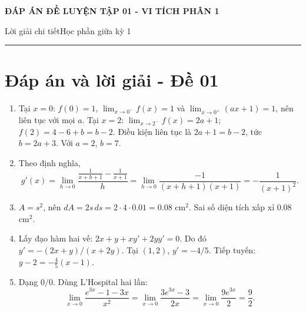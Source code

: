 \documentclass[11pt,a4paper]{article}
\newcommand{\examtitle}[4]{\begin{center}{\Large\bfseries\color{hcmusblue}#1}\par\vspace{3pt}{\large\bfseries #2}\par\vspace{3pt}\small #3\quad\textbullet\quad #4\end{center}\vspace{5pt}\hrule\vspace{8pt}}
\begin{document}
\examtitle{ĐÁP ÁN ĐỀ LUYỆN TẬP 01 - VI TÍCH PHÂN 1}{VI TÍCH PHÂN 1 - HCMUS (bộ luyện tập)}{Lời giải chi tiết}{Học phần giữa kỳ 1}

\section*{Đáp án và lời giải - Đề 01}
\begin{enumerate}
\item Tại $x=0$: $f(0)=1$, $\lim_{x\to0^-}f(x)=1$ và $\lim_{x\to0^+}(ax+1)=1$, nên liên tục với mọi $a$. Tại $x=2$: $\lim_{x\to2^-}f(x)=2a+1$; $f(2)=4-6+b=b-2$. Điều kiện liên tục là $2a+1=b-2$, tức $b=2a+3$. Với $a=2$, $b=7$.
\item Theo định nghĩa,
\[
g'(x)=\lim_{h\to0}\frac{\frac1{x+h+1}-\frac1{x+1}}h
=\lim_{h\to0}\frac{-1}{(x+h+1)(x+1)}=-\frac1{(x+1)^2}.
\]
\item $A=s^2$, nên $dA=2s\,ds=2\cdot4\cdot0.01=0.08\text{ cm}^2$. Sai số diện tích xấp xỉ $0.08$ cm$^2$.
\item Lấy đạo hàm hai vế: $2x+y+xy'+2yy'=0$. Do đó $y'=-(2x+y)/(x+2y)$. Tại $(1,2)$, $y'=-4/5$. Tiếp tuyến: $y-2=-\frac45(x-1)$.
\item Dạng $0/0$. Dùng L'Hospital hai lần:
\[
\lim_{x\to0}\frac{e^{3x}-1-3x}{x^2}=\lim_{x\to0}\frac{3e^{3x}-3}{2x}=\lim_{x\to0}\frac{9e^{3x}}2=\frac92.
\]
\end{enumerate}
\end{document}
